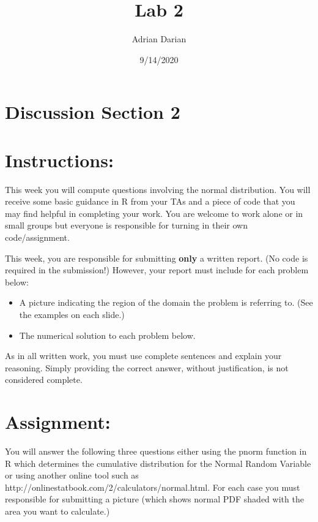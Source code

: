 \documentclass[a4paper]{article}
\title{Lab 2}
\author{Adrian Darian}
\date{9/14/2020}
\begin{document}
  
\maketitle
  
\section*{Discussion Section 2}

\section*{Instructions:}
This week you will compute questions involving the normal distribution. You will receive some basic guidance in R from your TAs and a piece of code that you may find helpful in
completing your work. You are welcome to work alone or in small groups but everyone is responsible for turning in their own code/assignment.

This week, you are responsible for submitting \textbf{only} a written report. (No code is required in the submission!) However, your report must include for each problem below:

\begin{itemize}
    \item A picture indicating the region of the domain the problem is referring to. (See the examples on each slide.)
    \item The numerical solution to each problem below.
\end{itemize}

As in all written work, you must use complete sentences and explain your reasoning. Simply providing the correct answer, without justification, is not considered complete.

\section*{Assignment:}
You will answer the following three questions either using the pnorm function in R which determines the cumulative distribution for the Normal Random Variable or using another online tool such as http://onlinestatbook.com/2/calculators/normal.html. For each case you must responsible for submitting a picture (which shows normal PDF shaded with the area you want to calculate.)
\end{document}
